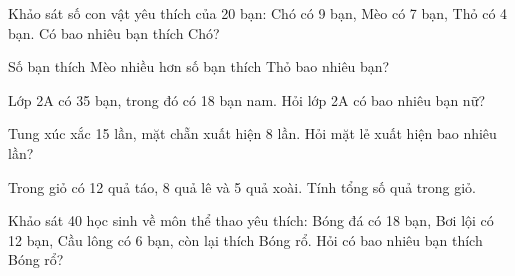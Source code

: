 \begin{ex} %
Khảo sát số con vật yêu thích của 20 bạn: Chó có 9 bạn, Mèo có 7 bạn, Thỏ có 4 bạn. Có bao nhiêu bạn thích Chó?
\end{ex}

\begin{ex} %
Số bạn thích Mèo nhiều hơn số bạn thích Thỏ bao nhiêu bạn?
\end{ex}

\begin{ex} %
Lớp 2A có 35 bạn, trong đó có 18 bạn nam. Hỏi lớp 2A có bao nhiêu bạn nữ?
\end{ex}

\begin{ex} %
Tung xúc xắc 15 lần, mặt chẵn xuất hiện 8 lần. Hỏi mặt lẻ xuất hiện bao nhiêu lần?
\end{ex}

\begin{ex} %
Trong giỏ có 12 quả táo, 8 quả lê và 5 quả xoài. Tính tổng số quả trong giỏ.
\end{ex}

\begin{ex} %
Khảo sát 40 học sinh về môn thể thao yêu thích: Bóng đá có 18 bạn, Bơi lội có 12 bạn, Cầu lông có 6 bạn, còn lại thích Bóng rổ. Hỏi có bao nhiêu bạn thích Bóng rổ?
\end{ex}
